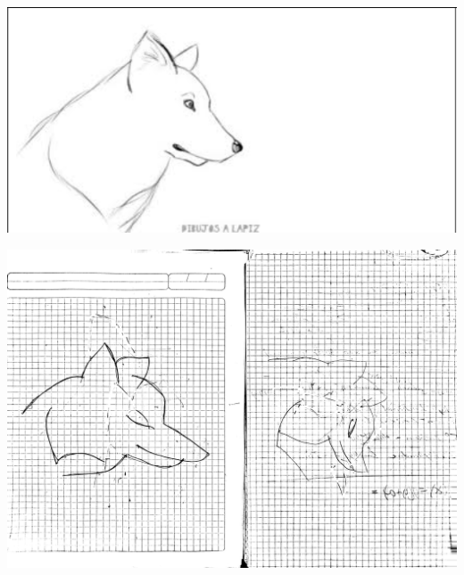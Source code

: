 \begin{center}
	\includegraphics[scale=0.7]{Images/4}
\end{center}

\begin{center}
	\includegraphics[scale=0.1]{Images/5}
\end{center}




